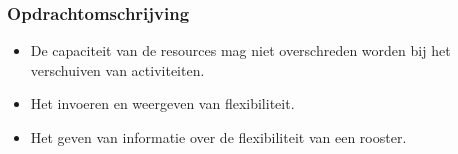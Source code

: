 \begin{frame}\frametitle{Opdrachtomschrijving}
	\begin{itemize}
		\item De capaciteit van de resources mag niet overschreden worden bij het verschuiven van activiteiten.
		\item Het invoeren en weergeven van flexibiliteit.
		\item Het geven van informatie over de flexibiliteit van een rooster.
	\end{itemize}
\end{frame}